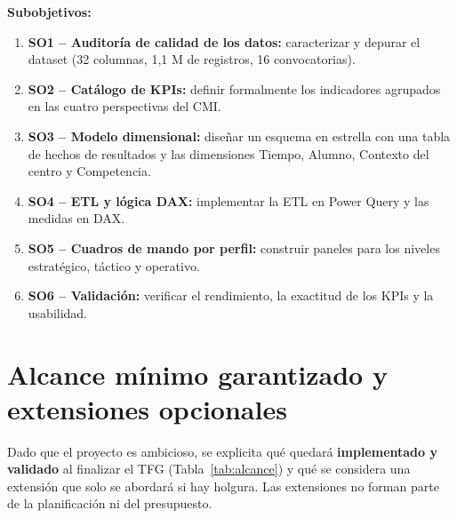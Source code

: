 \documentclass[12pt, a4paper, oneside]{report}
\begin{document}
\textbf{Subobjetivos:}
\begin{enumerate}
    \item \textbf{SO1 -- Auditoría de calidad de los datos:} caracterizar y depurar el dataset (32 columnas, 1,1 M de registros, 16 convocatorias).
    \item \textbf{SO2 -- Catálogo de KPIs:} definir formalmente los indicadores agrupados en las cuatro perspectivas del CMI.
    \item \textbf{SO3 -- Modelo dimensional:} diseñar un esquema en estrella con una tabla de hechos de resultados y las dimensiones Tiempo, Alumno, Contexto del centro y Competencia.
    \item \textbf{SO4 -- ETL y lógica DAX:} implementar la ETL en Power Query y las medidas en DAX.
    \item \textbf{SO5 -- Cuadros de mando por perfil:} construir paneles para los niveles estratégico, táctico y operativo.
    \item \textbf{SO6 -- Validación:} verificar el rendimiento, la exactitud de los KPIs y la usabilidad.
\end{enumerate}

\section{Alcance mínimo garantizado y extensiones opcionales}
\label{sec:alcance_min}
Dado que el proyecto es ambicioso, se explicita qué quedará \textbf{implementado y validado} al finalizar el TFG (Tabla~\ref{tab:alcance}) y qué se considera una extensión que solo se abordará si hay holgura. Las extensiones no forman parte de la planificación ni del presupuesto.
\end{document}
